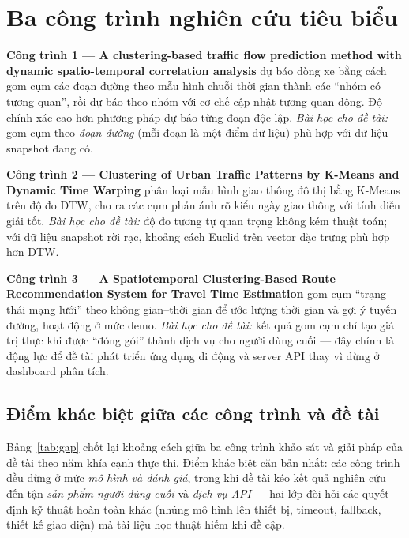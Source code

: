 \section{Ba công trình nghiên cứu tiêu biểu}

\textbf{Công trình 1 --- A clustering-based traffic flow prediction method with dynamic spatio-temporal correlation analysis} dự báo dòng xe bằng cách gom cụm các đoạn đường theo mẫu hình chuỗi thời gian thành các ``nhóm có tương quan'', rồi dự báo theo nhóm với cơ chế cập nhật tương quan động. Độ chính xác cao hơn phương pháp dự báo từng đoạn độc lập. \textit{Bài học cho đề tài:} gom cụm theo \textit{đoạn đường} (mỗi đoạn là một điểm dữ liệu) phù hợp với dữ liệu snapshot đang có.

\textbf{Công trình 2 --- Clustering of Urban Traffic Patterns by K-Means and Dynamic Time Warping} phân loại mẫu hình giao thông đô thị bằng K-Means trên độ đo DTW, cho ra các cụm phản ánh rõ kiểu ngày giao thông với tính diễn giải tốt. \textit{Bài học cho đề tài:} độ đo tương tự quan trọng không kém thuật toán; với dữ liệu snapshot rời rạc, khoảng cách Euclid trên vector đặc trưng phù hợp hơn DTW.

\textbf{Công trình 3 --- A Spatiotemporal Clustering-Based Route Recommendation System for Travel Time Estimation} gom cụm ``trạng thái mạng lưới'' theo không gian--thời gian để ước lượng thời gian và gợi ý tuyến đường, hoạt động ở mức demo. \textit{Bài học cho đề tài:} kết quả gom cụm chỉ tạo giá trị thực khi được ``đóng gói'' thành dịch vụ cho người dùng cuối --- đây chính là động lực để đề tài phát triển ứng dụng di động và server API thay vì dừng ở dashboard phân tích.

\subsection{Điểm khác biệt giữa các công trình và đề tài}
Bảng~\ref{tab:gap} chốt lại khoảng cách giữa ba công trình khảo sát và giải pháp của đề tài theo năm khía cạnh thực thi. Điểm khác biệt căn bản nhất: các công trình đều dừng ở mức \textit{mô hình và đánh giá}, trong khi đề tài kéo kết quả nghiên cứu đến tận \textit{sản phẩm người dùng cuối} và \textit{dịch vụ API} --- hai lớp đòi hỏi các quyết định kỹ thuật hoàn toàn khác (nhúng mô hình lên thiết bị, timeout, fallback, thiết kế giao diện) mà tài liệu học thuật hiếm khi đề cập.


